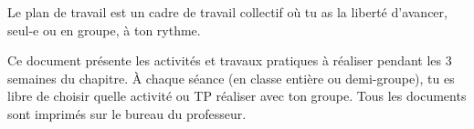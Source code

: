 \tetePremStssStru

\vspace*{-8pt}

\begin{importants}
  Le plan de travail est un cadre de travail collectif où tu as la liberté d'avancer, seul-e ou en groupe, à ton rythme.
  
  Ce document présente les activités et travaux pratiques à réaliser pendant les 3 semaines du chapitre.
  À chaque séance (en classe entière ou demi-groupe), tu es libre de choisir quelle activité ou TP réaliser avec ton groupe.
  Tous les documents sont imprimés sur le bureau du professeur.
\end{importants}


\vspace*{-16pt}

\setcounter{activiteNum}{4}

